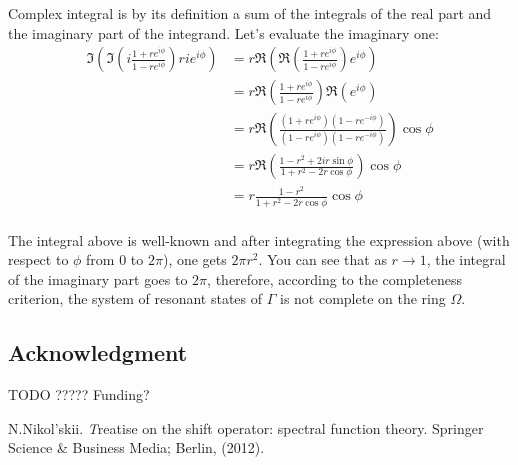 \documentclass{birkjour}
\theoremstyle{definition}
\theoremstyle{remark}
\numberwithin{equation}{section}
\begin{document}
Complex integral is by its definition a sum of the integrals of the real part and the imaginary part of the integrand. Let's evaluate the imaginary one:
\begin{align*}
\Im \left(  \Im \left( i \frac{1 + r e^{i \phi}}{1 - r e^{i \phi}} \right) r i e^{i \phi} \right)
 &= r \Re \left(  \Re \left( \frac{1 + r e^{i \phi}}{1 - r e^{i \phi}} \right) e^{i \phi} \right) \\
 &= r \Re \left( \frac{1 + r e^{i \phi}}{1 - r e^{i \phi}} \right) \Re \left(   e^{i \phi} \right) \\
 &= r \Re \left( \frac{(1 + r e^{i \phi}) (1 - r e^{-i \phi}) }{(1 - r e^{i \phi}) (1 - r e^{-i \phi})} \right) \cos \phi \\
 &= r \Re \left( \frac{1 - r^2 + 2 i r \sin \phi}{1 + r^2 - 2 r \cos \phi} \right) \cos \phi \\
 &= r \frac{1 - r^2}{1 + r^2 - 2 r \cos \phi} \cos \phi \\
\end{align*}

The integral above is well-known and after integrating the expression above (with respect to $\phi$ from $0$ to $2 \pi$), one gets $2 \pi r^2$. You can see that as $r \to 1$, the integral of the imaginary part goes to $2 \pi$, therefore, according to the completeness criterion, the system of resonant states of $\Gamma$ is not complete on the ring $\Omega$.


\subsection*{Acknowledgment}
TODO ????? Funding?


\begin{thebibliography}{1}
N.Nikol'skii. {\textit Treatise on the shift operator: spectral
function theory}. Springer Science \& Business Media; Berlin,
(2012).
\end{thebibliography}

\end{document}
